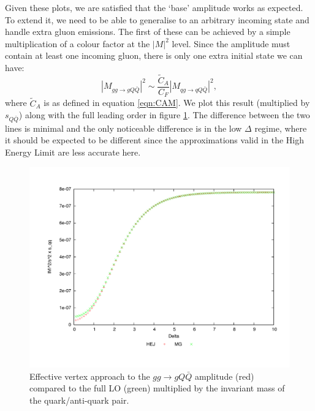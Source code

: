 Given these plots, we are satisfied that the `base' amplitude works as expected. To extend it, we need to be able to generalise to an arbitrary incoming state and handle extra gluon emissions. The first of these can be achieved by a simple multiplication of a colour factor at the $|M|^2$ level. Since the amplitude must contain at least one incoming gluon, there is only one extra initial state we can have:
\begin{equation}
|M_{gg \to gQ\bar{Q}}|^2 \sim \frac{\tilde{C}_A}{C_F} |M_{qg \to qQ\bar{Q}}|^2,
\end{equation}
where $\tilde{C}_A$ is as defined in equation \ref{eqn:CAM}. We plot this result (multiplied by $s_{Q\bar{Q}}$) along with the full leading order in figure \ref{fig:gg_qqq}. The difference between the two lines is minimal and the only noticeable difference is in the low $\Delta$ regime, where it should be expected to be different since the approximations valid in the High Energy Limit are less accurate here. 

\begin{figure}[t]
\centering
\includegraphics[scale=0.45]{Images/gg_gQQx_sqqx_simplecf.pdf}
\caption{Effective vertex approach to the $gg \to gQ\bar{Q}$ amplitude (red) compared to the full LO (green) multiplied by the invariant mass of the quark/anti-quark pair.}
\label{fig:gg_qqq}
\end{figure}

